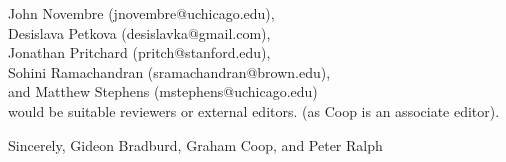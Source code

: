 \documentclass[11pt]{letter}
\begin{document}
John Novembre (jnovembre@uchicago.edu), \\
Desislava Petkova (desislavka@gmail.com), \\
Jonathan Pritchard (pritch@stanford.edu),  \\
Sohini Ramachandran (sramachandran@brown.edu), \\
and Matthew Stephens (mstephens@uchicago.edu) \\
would be suitable reviewers or external editors.
(as Coop is an associate editor).

Sincerely,
Gideon Bradburd, 
Graham Coop, and 
Peter Ralph
\end{document}

